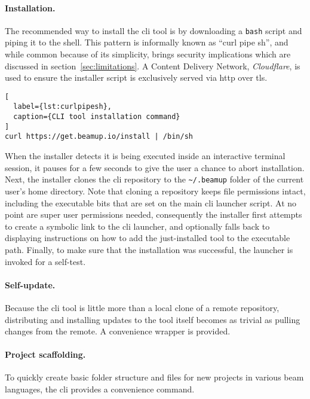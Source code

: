 \paragraph{Installation.} The recommended way to install the \acrshort{cli} tool is by downloading a \lstinline|bash| script and piping it to the shell. This pattern is informally known as ``curl pipe sh'', and while common because of its simplicity, brings security implications which are discussed in section~\ref{sec:limitations}. A Content Delivery Network, \emph{Cloudflare}, is used to ensure the installer script is exclusively served via \acrshort{http} over \acrshort{tls}.

\begin{lstlisting}[
  label={lst:curlpipesh},
  caption={CLI tool installation command}
]
curl https://get.beamup.io/install | /bin/sh
\end{lstlisting}

When the installer detects it is being executed inside an interactive terminal session, it pauses for a few seconds to give the user a chance to abort installation. Next, the installer clones the \acrshort{cli} repository to the \lstinline|~/.beamup| folder of the current user's home directory. Note that cloning a repository keeps file permissions intact, including the executable bits that are set on the main \acrshort{cli} launcher script. At no point are super user permissions needed, consequently the installer first attempts to create a symbolic link to the \acrshort{cli} launcher, and optionally falls back to displaying instructions on how to add the just-installed tool to the executable path. Finally, to make sure that the installation was successful, the launcher is invoked for a self-test.

\paragraph{Self-update.} Because the \acrshort{cli} tool is little more than a local clone of a remote repository, distributing and installing updates to the tool itself becomes as trivial as pulling changes from the remote. A convenience wrapper is provided.

\paragraph{Project scaffolding.} To quickly create basic folder structure and files for new projects in various \acrshort{beam} languages, the \acrshort{cli} provides a convenience command.

